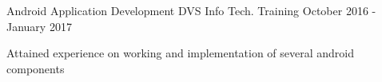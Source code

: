 \begin{cventries}
\cventry
    {Android Application Development} %
    {DVS Info Tech.} %
    {Training} %
    {October 2016 - January 2017} %
    {
      \begin{cvitems} %
       \item {Attained experience on working and implementation of several android components }
      \end{cvitems}
      }
\end{cventries}


